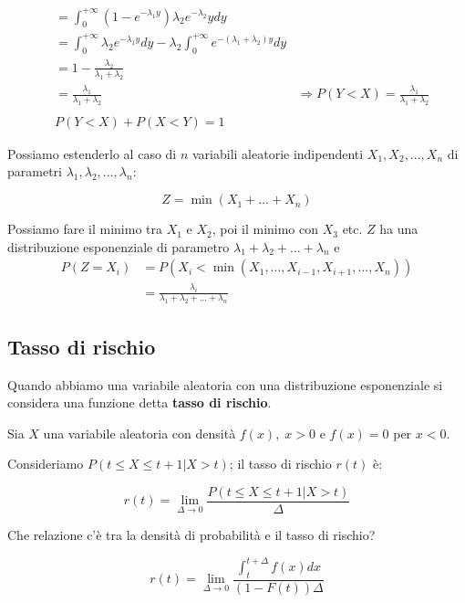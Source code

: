 \documentclass[a4paper,12pt]{book}
\begin{document}
\begin{align*}
	& = \int_{0}^{+\infty} (1- e^{-\lambda_1 y}) \lambda_2 e^{-\lambda_2}y dy \\
	& = \int_{0}^{+\infty} \lambda_2 e^{-\lambda_1 y} dy -\lambda_2 \int_{0}^{+\infty} e^{-(\lambda_1 + \lambda_2)y} dy \\
	& = 1 - \frac{\lambda_2}{\lambda_1 + \lambda_2} \\
	& = \frac{\lambda_1}{\lambda_1 + \lambda_2}
	& \Rightarrow P(Y < X) = \frac{\lambda_1}{\lambda_1 + \lambda_2}
	\\
	\\
	& P(Y < X) + P(X < Y) = 1 %
\end{align*}

Possiamo estenderlo al caso di $ n $ variabili aleatorie indipendenti $ X_1, X_2, ..., X_n $ di parametri $ \lambda_1, \lambda_2, ..., \lambda_n $:

$$ Z = \min(X_1 + ... + X_n) $$

Possiamo fare il minimo tra $ X_1 $ e $ X_2 $, poi il minimo con $ X_3 $ etc. 
$ Z $ ha una distribuzione esponenziale di parametro $ \lambda_1 + \lambda_2 + ... + \lambda_n $ e 
\begin{align*}
	P(Z = X_i) & = P(X_i < \min(X_1, ..., X_{i-1}, X_{i+1}, ..., X_n)) \\
	& = \frac{\lambda_i}{\lambda_1 + \lambda_2 + ... + \lambda_n}
\end{align*}

\subsection{Tasso di rischio} %
Quando abbiamo una variabile aleatoria con una distribuzione esponenziale si considera una funzione detta \textbf{tasso di rischio}. %

Sia $ X $ una variabile aleatoria con densità $ f(x), \; x > 0 $ e $ f(x) = 0 $ per $ x < 0 $.

Consideriamo $ P(t \le X \le t+1 | X > t) $; il tasso di rischio $ r(t) $ è:

$$ r(t) = \lim\limits_{\Delta \to 0} \frac{P(t \le X \le t+1 | X > t)}{\Delta}$$ %

Che relazione c'è tra la densità di probabilità e il tasso di rischio?

$$ r(t) = \lim\limits_{\Delta \to 0} \frac{\int_{t}^{t + \Delta} f(x)dx }{(1 - F(t))\Delta}$$ 
\end{document}

